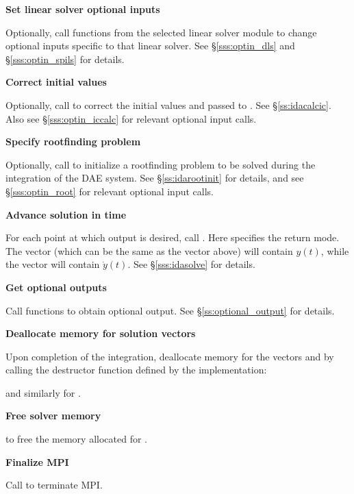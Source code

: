 \begin{Steps}


\item
  {\bf Set linear solver optional inputs}

  Optionally, call  functions from the selected linear solver module to
  change optional inputs specific to that linear solver.
  See \S\ref{sss:optin_dls} and \S\ref{sss:optin_spils} for details.

\item 
  {\bf Correct initial values}

  Optionally, call  to correct the initial values
   and  passed to .  See \S\ref{ss:idacalcic}.
  Also see \S\ref{sss:optin_iccalc} for relevant optional input calls.

\item
  {\bf Specify rootfinding problem}

  Optionally, call  to initialize a rootfinding problem
  to be solved during the integration of the DAE system.
  See \S\ref{ss:idarootinit} for details, and see \S\ref{sss:optin_root}
  for relevant optional input calls.

\item
  {\bf Advance solution in time}

  For each point at which output is desired, call
  .
  Here  specifies the return mode.  The vector 
  (which can be the same as the vector  above) will contain $y(t)$,
  while the vector  will contain $\dot{y}(t)$.
  See \S\ref{sss:idasolve} for details.
  
\item
  {\bf Get optional outputs}

  Call  functions to obtain optional output.
  See \S\ref{ss:optional_output} for details.

\item
  {\bf Deallocate memory for solution vectors}

  Upon completion of the integration, deallocate memory for the vectors 
  and  by calling the destructor function defined by the {\nvector} 
  implementation:

  {\s} 

  {\p} 
  
  and similarly for .
  
\item
  {\bf Free solver memory}

   to free the memory allocated for {\ida}.
  
\item 
  {\bf {\p} Finalize MPI}
  
  Call  to terminate MPI.

\end{Steps}

